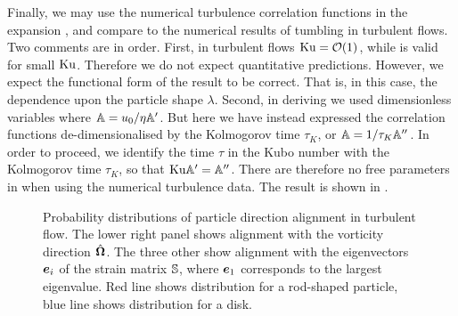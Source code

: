 \documentclass[thesis.tex]{subfiles}
\begin{document}
Finally, we may use the numerical turbulence correlation functions in the expansion , and compare to the numerical results of tumbling in turbulent flows. Two comments are in order. First, in turbulent flows $\mbox{Ku}=\mathcal O(1)$, while  is valid for small $\mbox{Ku}$. Therefore we do not expect quantitative predictions. However, we expect the functional form of the result to be correct. That is, in this case, the dependence upon the particle shape $\lambda$. Second, in deriving  we used dimensionless variables where $\mathbb{A} = u_0/\eta \mathbb{A}'$. But here we have instead expressed the correlation functions de-dimensionalised by the Kolmogorov time $\tau_{K}$, or $\mathbb{A} = 1/\tau_{K} \mathbb{A}''$. In order to proceed, we identify the time $\tau$ in the Kubo number with the Kolmogorov time $\tau_{K}$, so that $\mbox{Ku} \mathbb{A}'= \mathbb{A}''$. There are therefore no free parameters in  when using the numerical turbulence data. The result is shown in . 






\begin{figure}
\caption{ Probability distributions of particle direction alignment in turbulent flow. The lower right panel shows alignment with the vorticity direction $\hat{\mbox{\boldmath$\Omega$}}$. The three other show alignment with the eigenvectors $\mbox{\boldmath$e$}_i$ of the strain matrix $\mathbb{S}$, where $\mbox{\boldmath$e$}_1$ corresponds to the largest eigenvalue. Red line shows distribution for a rod-shaped particle, blue line shows distribution for a disk.}%
\end{figure}
\end{document}
